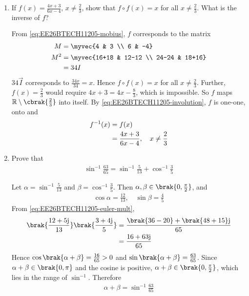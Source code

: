 \begin{enumerate}[label=\thesubsection.\arabic*, ref=\thesubsection.\theenumi, itemsep=3ex]
\item
If $f(x) = \frac{4x+3}{6x-4}$, $x \neq \frac{2}{3}$, show that $f\circ f(x) = x$ for all $x \neq \frac{2}{3}$. What is the inverse of $f$?

\medskip
\solution From \eqref{eq:EE26BTECH11205-mobius}, $f$ corresponds to the matrix
\begin{align}
	\vec{M} &= \myvec{4 & 3 \\ 6 & -4}
	\\
	\vec{M}^2 &= \myvec{16+18 & 12-12 \\ 24-24 & 18+16} \notag
	\\
	&= 34\vec{I}
\end{align}
$34\vec{I}$ corresponds to $\frac{34x}{34} = x$. Hence $f\circ f(x) = x$ for all $x \neq \frac{2}{3}$.
Further, $f(x) = \frac{2}{3}$ would require $4x+3 = 4x - \frac{8}{3}$, which is impossible. So $f$ maps $\mathbb{R}\setminus\cbrak{\frac{2}{3}}$ into itself. By \eqref{eq:EE26BTECH11205-involution}, $f$ is one-one, onto and
\begin{align}
	f^{-1}(x) &= f(x) \notag
	\\
	&= \frac{4x+3}{6x-4}, \quad x \neq \frac{2}{3}
\end{align}

\item
Prove that
\begin{align}
	\sin^{-1}\frac{63}{65} = \sin^{-1}\frac{5}{13} + \cos^{-1}\frac{3}{5}
\end{align}

\medskip
\solution
Let $\alpha = \sin^{-1}\frac{5}{13}$ and $\beta = \cos^{-1}\frac{3}{5}$. Then $\alpha,\beta \in \brak{0,\frac{\pi}{2}}$, and
\begin{align}
	\cos\alpha = \frac{12}{13},\quad \sin\beta = \frac{4}{5}
\end{align}
From \eqref{eq:EE26BTECH11205-euler-mult},
\begin{align}
	\brak{\frac{12+5\mathrm{j}}{13}}\brak{\frac{3+4\mathrm{j}}{5}} &= \frac{\brak{36-20} + \brak{48+15}\mathrm{j}}{65} \notag
	\\
	&= \frac{16+63\mathrm{j}}{65}
\end{align}
Hence $\cos\brak{\alpha+\beta} = \frac{16}{65} > 0$ and $\sin\brak{\alpha+\beta} = \frac{63}{65}$. Since $\alpha + \beta \in \brak{0,\pi}$ and the cosine is positive, $\alpha+\beta \in \brak{0,\frac{\pi}{2}}$, which lies in the range of $\sin^{-1}$. Therefore
\begin{align}
	\alpha + \beta = \sin^{-1}\frac{63}{65}
\end{align}


\end{enumerate}
